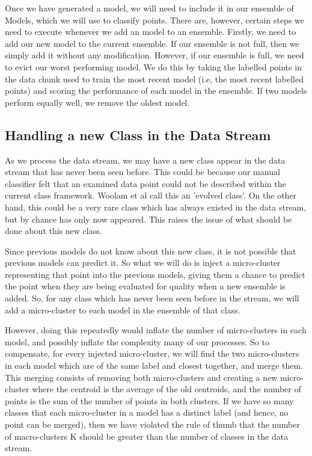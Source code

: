 \documentclass[12pt,a4paper,oneside]{report}
\begin{document}
Once we have generated a model, we will need to include it in our ensemble of Models, which we will use to classify points. There are, however, certain steps we need to execute whenever we add an model to an ensemble. Firstly, we need to add our new model to the current ensemble. If our ensemble is not full, then we simply add it without any modification. However, if our ensemble is full, we need to evict our worst performing model. We do this by taking the labelled points in the data chunk used to train the most recent model (i.e, the most recent labelled points) and scoring the performance of each model in the ensemble. If two models perform equally well, we remove the oldest model.

\subsection{Handling a new Class in the Data Stream}

As we process the data stream, we may have a new class appear in the data stream that has never been seen before. This could be because our manual classifier felt that an examined data point could not be described within the current class framework. Woolam et al\cite{LabStr} call this an 'evolved class'. On the other hand, this could be a very rare class which has always existed in the data stream, but by chance has only now appeared. This raises the issue of what should be done about this new class. 

Since previous models do not know about this new class, it is not possible that previous models can predict it. So what we will do is inject a micro-cluster representing that point into the previous models, giving them a chance to predict the point when they are being evaluated for quality when a new ensemble is added. So, for any class which has never been seen before in the stream, we will add a micro-cluster to each model in the ensemble of that class. 

However, doing this repeatedly would inflate the number of micro-clusters in each model, and possibly inflate the complexity many of our processes. So to compensate, for every injected micro-cluster, we will find the two micro-clusters in each model which are of the same label and closest together, and merge them. This merging consists of removing both micro-clusters and creating a new micro-cluster where the centroid is the average of the old centroids, and the number of points is the sum of the number of points in both clusters. If we have so many classes that each micro-cluster in a model has a distinct label (and hence, no point can be merged), then we have violated the rule of thumb that the number of macro-clusters K should be greater than the number of classes in the data stream. 
\end{document}
